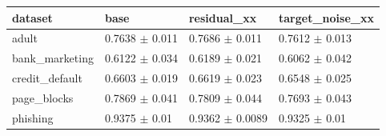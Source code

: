 \begin{tabular}{llll}
\toprule
dataset & base & residual\_xx & target\_noise\_xx \\
\midrule
adult & 0.7638 $\pm$ 0.011 & 0.7686 $\pm$ 0.011 & 0.7612 $\pm$ 0.013 \\
bank\_marketing & 0.6122 $\pm$ 0.034 & 0.6189 $\pm$ 0.021 & 0.6062 $\pm$ 0.042 \\
credit\_default & 0.6603 $\pm$ 0.019 & 0.6619 $\pm$ 0.023 & 0.6548 $\pm$ 0.025 \\
page\_blocks & 0.7869 $\pm$ 0.041 & 0.7809 $\pm$ 0.044 & 0.7693 $\pm$ 0.043 \\
phishing & 0.9375 $\pm$ 0.01 & 0.9362 $\pm$ 0.0089 & 0.9325 $\pm$ 0.01 \\
\bottomrule
\end{tabular}
